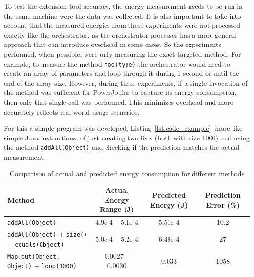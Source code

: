 To test the extension tool accuracy, the energy measurement needs to be run in the same machine were the data was collected. It is also important to take into account that the measured energies from these experiments were not processed exactly like the orchestrator, as the orchestrator processer has a more general approach that can introduce overhead in some cases. {\color{blue}So the experiments performed, when possible, were only measuring the exact targeted method. For example, to measure the method \texttt{foo(type)} the orchestrator would need to create an array of parameters and loop through it during 1 second or until the end of the array size. However, during these experiments, if a single invocation of the method was sufficient for PowerJoular to capture its energy consumption, then only that single call was performed. This minimizes overhead and more accurately reflects real-world usage scenarios}.

For this a simple program was developed, Listing~\ref{lst:code_example}, more like simple Java instructions, of just creating two lists (both with size 1000) and using the method \texttt{addAll(Object)} and checking if the prediction matches the actual measurement.

\begin{table}[htbp]
  \centering
  \label{tab:energy_comparison}
  \footnotesize
  \begin{tabular}{>{\raggedright\arraybackslash}p{4cm}ccc}
    \toprule
    Method & Actual Energy Range (J) & Predicted Energy (J) & Prediction Error (\%) \\
    \midrule
    \texttt{addAll(Object)} & 4.9e-4 -- 5.1e-4 & 5.51e-4 & 10.2 \\
    \midrule
    \texttt{addAll(Object)} + \texttt{size()} + \texttt{equals(Object)} & 5.0e-4 -- 5.2e-4 & 6.49e-4 & 27 \\
    \midrule
    \texttt{Map.put(Object, Object)} + \texttt{loop(1000)} & 0.0027 -- 0.0030 & 0.033 &  1058 \\
    \bottomrule
  \end{tabular}
  \vspace{0.5em}
  \caption{Comparison of actual and predicted energy consumption for different methods}
\end{table}


